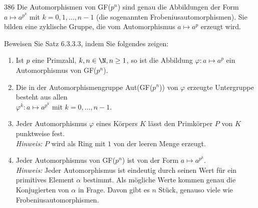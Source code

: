 \begin{algebraUE}{386}
  Die Automorphismen von GF($p^n$) sind genau die Abbildungen der Form $a \mapsto a^{p^k}$
  mit $k = 0,1,\dots,n-1$ (die sogenannten Frobeniusautomorphismen). Sie bilden
  eine zyklische Gruppe, die vom Automorphismus $a \mapsto a^p$ erzeugt wird.


Beweisen Sie Satz 6.3.3.3, indem Sie folgendes zeigen:
\begin{enumerate}
  \item Ist $p$ eine Primzahl, $k,n \in \N, n \geq 1$, so ist die Abbildung
  $\varphi: a \mapsto a^p$ ein Automorphismus von GF($p^n$).
  \item Die in der Automorphismengruppe Aut(GF($p^n$)) von $\varphi$ erzeugte
  Untergruppe besteht aus allen \\
  $\varphi^k: a \mapsto a^{p^k}$ mit $k = 0,\dots,n-1$.
  \item Jeder Automorphismus $\varphi$ eines Körpers $K$ lässt den Primkörper $P$
  von $K$ punktweise fest. \\
  \textit{Hinweis:} $P$ wird als Ring mit $1$ von der leeren Menge erzeugt.
  \item Jeder Automorphismus von GF($p^n$) ist von der Form $a \mapsto a^{p^k}$. \\
  \textit{Hinweis:} Jeder Automorphismus ist eindeutig durch seinen Wert
  für ein primitives Element $\alpha$ bestimmt. Als mögliche Werte kommen genau
  die Konjugierten von $\alpha$ in Frage. Davon gibt es $n$ Stück, genauso viele
  wie Frobeniusautomorphismen.
\end{enumerate}
\end{algebraUE}
